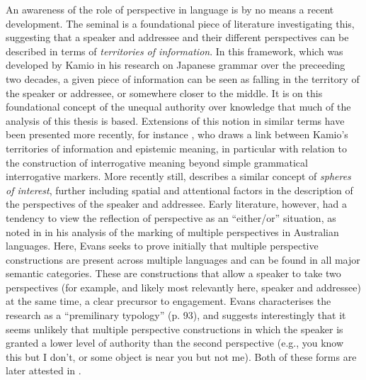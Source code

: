 An awareness of the role of perspective in language is by no means a recent development. The seminal  is a foundational piece of literature investigating this, suggesting that a speaker and addressee and their different perspectives can be described in terms of \textit{territories of information}. In this framework, which was developed by Kamio in his research on Japanese grammar over the preceeding two decades, a given piece of information can be seen as falling in the territory of the speaker or addressee, or somewhere closer to the middle. It is on this foundational concept of the unequal authority over knowledge that much of the analysis of this thesis is based. Extensions of this notion in similar terms have been presented more recently, for instance , who draws a link between Kamio's territories of information and epistemic meaning, in particular with relation to the construction of interrogative meaning beyond simple grammatical interrogative markers. More recently still,  describes a similar concept of \textit{spheres of interest}, further including spatial and attentional factors in the description of the perspectives of the speaker and addressee. Early literature, however, had a tendency to view the reflection of perspective as an ``either/or'' situation, as noted in  in his analysis of the marking of multiple perspectives in Australian languages. Here, Evans seeks to prove initially that multiple perspective constructions are present across multiple languages and can be found in all major semantic categories. These are constructions that allow a speaker to take two perspectives (for example, and likely most relevantly here, speaker and addressee) at the same time, a clear precursor to engagement. Evans characterises the research as a ``premilinary typology'' (p. 93), and suggests interestingly that it seems unlikely that multiple perspective constructions in which the speaker is granted a lower level of authority than the second perspective (e.g., you know this but I don't, or some object is near you but not me). Both of these forms are later attested in . 

